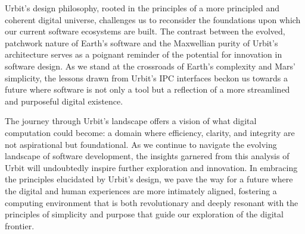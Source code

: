 \documentclass[twoside]{article}
\begin{document}
Urbit's design philosophy, rooted in the principles of a more principled and coherent digital universe, challenges us to reconsider the foundations upon which our current software ecosystems are built. 
The contrast between the evolved, patchwork nature of Earth's software and the Maxwellian purity of Urbit's architecture serves as a poignant reminder of the potential for innovation in software design. 
As we stand at the crossroads of Earth's complexity and Mars' simplicity, the lessons drawn from Urbit's IPC interfaces beckon us towards a future where software is not only a tool but a reflection of a more streamlined and purposeful digital existence.

The journey through Urbit's landscape offers a vision of what digital computation could become: a domain where efficiency, clarity, and integrity are not aspirational but foundational. 
As we continue to navigate the evolving landscape of software development, the insights garnered from this analysis of Urbit will undoubtedly inspire further exploration and innovation. 
In embracing the principles elucidated by Urbit's design, we pave the way for a future where the digital and human experiences are more intimately aligned, fostering a computing environment that is both revolutionary and deeply resonant with the principles of simplicity and purpose that guide our exploration of the digital frontier.




\printbibliography
\end{document}
